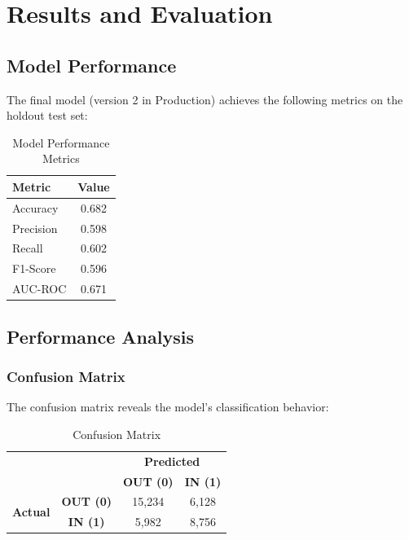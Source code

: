 \section{Results and Evaluation}

\subsection{Model Performance}

The final model (version 2 in Production) achieves the following metrics on the holdout test set:

\begin{table}[h]
\centering
\caption{Model Performance Metrics}
\begin{tabular}{lc}
\toprule
\textbf{Metric} & \textbf{Value} \\
\midrule
Accuracy & 0.682 \\
Precision & 0.598 \\
Recall & 0.602 \\
F1-Score & 0.596 \\
AUC-ROC & 0.671 \\
\bottomrule
\end{tabular}
\label{tab:metrics}
\end{table}

\subsection{Performance Analysis}

\subsubsection{Confusion Matrix}

The confusion matrix reveals the model's classification behavior:

\begin{table}[h]
\centering
\caption{Confusion Matrix}
\begin{tabular}{cc|cc}
\multicolumn{2}{c}{} & \multicolumn{2}{c}{\textbf{Predicted}} \\
& & \textbf{OUT (0)} & \textbf{IN (1)} \\
\hline
\multirow{2}{*}{\textbf{Actual}} & \textbf{OUT (0)} & 15,234 & 6,128 \\
& \textbf{IN (1)} & 5,982 & 8,756 \\
\end{tabular}
\label{tab:confusion}
\end{table}

